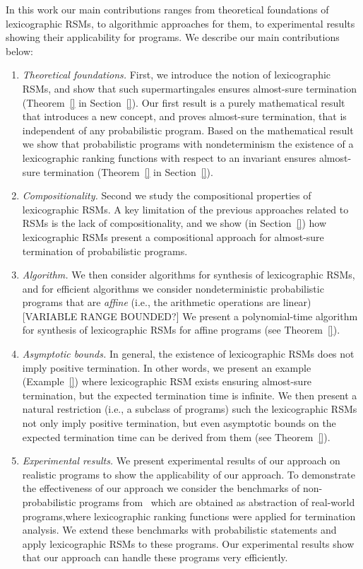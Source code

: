 \smallskip{} 
In this work our main contributions ranges from theoretical foundations of lexicographic
RSMs, to algorithmic approaches for them, to experimental results
showing their applicability for programs.
We describe our main contributions below:
\begin{enumerate}

\item {\em Theoretical foundations.} 
First, we introduce the notion of lexicographic RSMs, and show that
such supermartingales ensures almost-sure termination (Theorem~\ref{} in Section~\ref{}). 
Our first result is a purely mathematical result that introduces a new concept, and 
proves almost-sure termination, that is independent of any probabilistic program.
Based on the mathematical result we show that probabilistic programs with nondeterminism
the existence of a lexicographic ranking functions with respect to an invariant ensures
almost-sure termination (Theorem~\ref{} in Section~\ref{}).

\item {\em Compositionality.} 
Second we study the compositional properties of lexicographic RSMs.
A key limitation of the previous approaches related to RSMs is the lack 
of compositionality, and we show (in Section~\ref{}) how lexicographic RSMs 
present a compositional approach for almost-sure termination of probabilistic programs.

\item {\em Algorithm.} We then consider algorithms for synthesis of lexicographic RSMs, 
and for efficient algorithms we consider nondeterministic probabilistic 
programs that are {\em affine} (i.e., the arithmetic operations are linear)
[VARIABLE RANGE BOUNDED?]
We present a polynomial-time algorithm for synthesis of lexicographic RSMs 
for affine programs (see Theorem~\ref{}).


\item {\em Asymptotic bounds.} 
In general, the existence of lexicographic RSMs does not imply positive
termination. 
In other words, we present an example (Example~\ref{}) where lexicographic RSM exists ensuring
almost-sure termination, but the expected termination time is infinite.
We then present a natural restriction (i.e., a subclass of programs) such the lexicographic 
RSMs not only imply positive termination, but even asymptotic bounds on the expected termination 
time can be derived from them (see Theorem~\ref{}).


\item {\em Experimental results.} 
We present experimental results of our approach on realistic programs to show the applicability 
of our approach. 
To demonstrate the effectiveness of our approach we consider the benchmarks of non-probabilistic
programs from~\cite{} which are obtained as abstraction of real-world programs,where 
lexicographic ranking functions were applied for termination analysis. 
We extend these benchmarks with probabilistic statements and apply lexicographic RSMs to these
programs. 
Our experimental results show that our approach can handle these programs very efficiently.


\end{enumerate}





